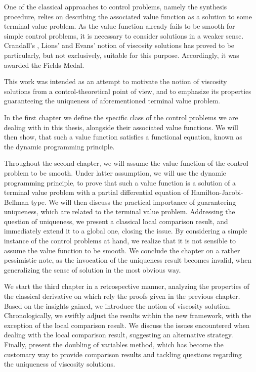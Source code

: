 \newpage

One of the classical approaches to control problems, namely the synthesis procedure, relies on describing the associated value function as a solution to some terminal value problem. As the value function already fails to be smooth for simple control problems, it is necessary to consider solutions in a weaker sense.
Crandall's \cite{lions}, Lions' \cite{lions1982fully, lions1982generalized} and Evans' \cite{crandall1984some} notion of viscosity solutions has proved to be particularly, but not exclusively, suitable for this purpose. Accordingly, it was awarded the Fields Medal.

This work was intended as an attempt to motivate the notion of viscosity solutions from a control-theoretical point of view, and to emphasize its properties guaranteeing the uniqueness of aforementioned terminal value problem. 

In the first chapter we define the specific class of the control problems we are dealing with in this thesis, alongside their associated value functions. We will then show, that such a value function satisfies a functional equation, known as the dynamic programming principle.

Throughout the second chapter, we will assume the value function of the control problem to be smooth. Under latter assumption, we will use the dynamic programming principle, to prove that such a value function is a solution of a terminal value problem with a partial differential equation of Hamilton-Jacobi-Bellman type. We will then discuss the practical importance of guaranteeing uniqueness, which are related to the terminal value problem. Addressing the question of uniqueness, we present a classical local comparison result, and immediately extend it to a global one, closing the issue. By considering a simple instance of the control problems at hand, we realize that it is not sensible to assume the value function to be smooth. We conclude the chapter on a rather pessimistic note, as the invocation of the uniqueness result becomes invalid, when generalizing the sense of solution in the most obvious way.

We start the third chapter in a retrospective manner, analyzing the properties of the classical derivative on which rely the proofs given in the previous chapter. Based on the insights gained, we introduce the notion of viscosity solution. Chronologically, we swiftly adjust the results within the new framework, with the exception of the local comparison result. We discuss the issues encountered when dealing with the local comparison result, suggesting an alternative strategy. Finally, present the doubling of variables method, which has become the customary way to provide comparison results and tackling questions regarding the uniqueness of viscosity solutions.

